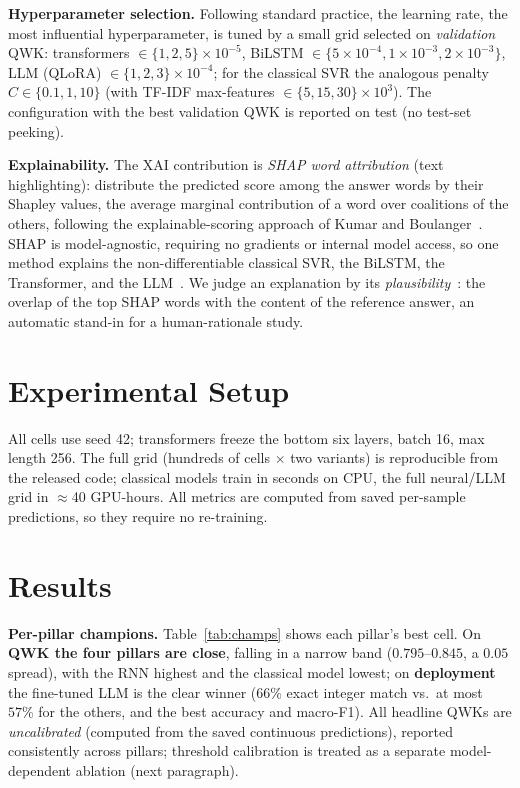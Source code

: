 \documentclass[journal]{IEEEtran}
\begin{document}
\textbf{Hyperparameter selection.} Following standard practice, the learning rate, the most
influential hyperparameter, is tuned by a small grid selected on \emph{validation} QWK:
transformers $\in\{1,2,5\}{\times}10^{-5}$, BiLSTM $\in\{5{\times}10^{-4},1{\times}10^{-3},
2{\times}10^{-3}\}$, LLM (QLoRA) $\in\{1,2,3\}{\times}10^{-4}$; for the classical SVR the analogous
penalty $C\in\{0.1,1,10\}$ (with TF-IDF max-features $\in\{5,15,30\}{\times}10^{3}$). The
configuration with the best validation QWK is reported on test (no test-set peeking).

\textbf{Explainability.} The XAI contribution is \emph{SHAP word attribution} (text highlighting):
distribute the predicted score among the answer words by their Shapley values, the average marginal
contribution of a word over coalitions of the others, following the explainable-scoring approach of
Kumar and Boulanger~\cite{kumar2020explainable}. SHAP is model-agnostic, requiring no gradients or
internal model access, so one method explains the non-differentiable classical SVR, the BiLSTM, the
Transformer, and the LLM~\cite{lundberg2017shap,pinto2025attribution}. We judge an explanation by its
\emph{plausibility}~\cite{jacovi2020faithfulness,lyu2024faithfulsurvey}: the overlap of the top SHAP
words with the content of the reference answer, an automatic stand-in for a human-rationale study.

\section{Experimental Setup}
All cells use seed 42; transformers freeze the bottom six layers,
batch 16, max length 256. The full grid (hundreds of cells $\times$ two variants) is reproducible
from the released code; classical models train in seconds on CPU, the full neural/LLM grid in
$\approx$40 GPU-hours. All metrics are computed from saved per-sample predictions, so they require
no re-training.

\section{Results}\label{sec:results}
\textbf{Per-pillar champions.} Table~\ref{tab:champs} shows each pillar's best cell. On
\textbf{QWK the four pillars are close}, falling in a narrow band ($0.795$--$0.845$, a $0.05$
spread), with the RNN highest and the classical model lowest; on \textbf{deployment} the fine-tuned
LLM is the clear winner ($66\%$ exact integer match vs.\ at most $57\%$ for the others, and the best
accuracy and macro-F1). All headline QWKs are \emph{uncalibrated} (computed from the saved
continuous predictions), reported consistently across pillars; threshold calibration is treated as
a separate model-dependent ablation (next paragraph).
\end{document}
